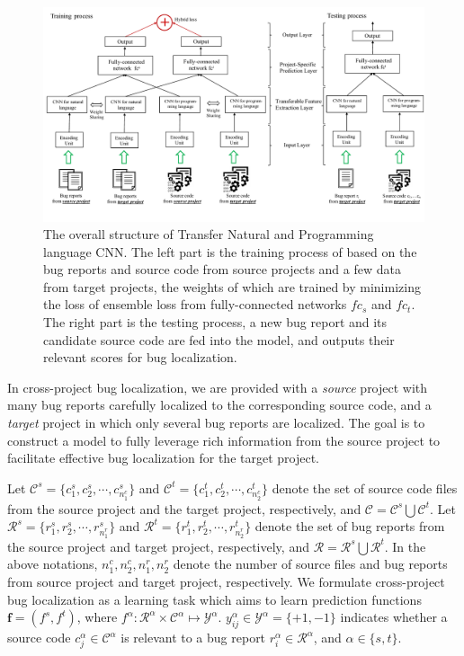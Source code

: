 
\begin{figure}[hbt]
\centering
\includegraphics[width = 2\columnwidth]{pic/structure.pdf}
\caption{The overall structure of Transfer Natural and Programming language CNN.  The left part is the training process of \TRANPCNN based on the bug reports and source code from source projects and a few data from target projects, the weights of which are trained by minimizing the loss of ensemble loss from fully-connected networks $fc_s$ and $fc_t$. The right part is the testing process, a new bug report and its candidate source code are fed into the model, and \TRANPCNN outputs their relevant scores for bug localization.}
\label{fig:structure}
\end{figure}

In cross-project bug localization, we are provided with a \emph{source} project with many bug reports carefully localized to the corresponding source code, and a \emph{target} project in which only several bug reports are localized. The goal is to construct a model to fully leverage rich information from the source project to facilitate effective bug localization for the target project.

Let $\mathcal{C}^s = \{ { c^s_1, c^s_2}, \cdots, c^s_{n^c_1} \} $ and $\mathcal{C}^t =\{ c^t_1, c^t_2, \cdots, c^t_{n^c_2} \}$ denote the set of source code files from the source project and the target project, respectively, and $\mathcal{C}=\mathcal{C}^s \bigcup \mathcal{C}^t $. Let $\mathcal{R}^s =\{r^s_1, r^s_2, \cdots, r^s_{n^r_1}\}$ and $\mathcal{R}^t =\{ r^t_1, r^t_2, \cdots, r^t_{n^r_2}\}$ denote the set of bug reports from the source project and target project, respectively, and $\mathcal{R}=\mathcal{R}^s \bigcup \mathcal{R}^t $. In the above notations, $n^c_1, n^c_2, n^r_1, n^r_2$ denote the number of source files and bug reports from source project and target project, respectively. We formulate cross-project bug localization as a learning task which aims to learn prediction functions $\mathbf{f}=(f^s,f^t)$, where $f^\alpha: \mathcal{R}^\alpha \times \mathcal{C}^\alpha \mapsto \mathcal{Y}^\alpha$. $y^\alpha_{ij} \in \mathcal{Y}^\alpha = \{+1, -1\}$ indicates whether a source code $c^\alpha_j \in \mathcal{C}^\alpha $ is relevant to a bug report $r^\alpha_i \in \mathcal{R}^\alpha$, and $\alpha \in \{s,t\}$.   %

